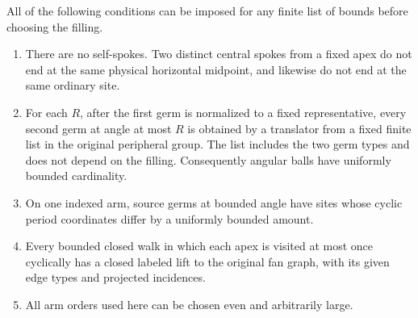 \begin{lemma}\label{fan:angle-dictionary}
All of the following conditions can be imposed for any finite list of
bounds before choosing the filling.
\begin{enumerate}[label=\textup{(\roman*)}]
\item There are no self-spokes.  Two distinct central spokes from a
fixed apex do not end at the same physical horizontal midpoint, and
likewise do not end at the same ordinary site.
\item For each $R$, after the first germ is normalized to a fixed
representative, every second germ at angle at most $R$ is obtained by a
translator from a fixed finite list in the original peripheral group.
The list includes the two germ types and does not depend on the filling.
Consequently angular balls have uniformly bounded cardinality.
\item On one indexed arm, source germs at bounded angle have sites
whose cyclic period coordinates differ by a uniformly bounded amount.
\item Every bounded closed walk in which each apex is visited at most
once cyclically has a closed labeled lift to the original fan graph,
with its given edge types and projected incidences.
\item All arm orders used here can be chosen even and arbitrarily
large.
\end{enumerate}
\end{lemma}

